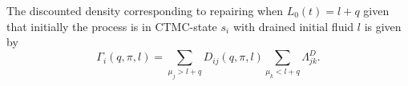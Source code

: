 \begin{theorem}
	The discounted density corresponding to repairing when $L_0(t)=l+q$ given that initially the process is in CTMC-state $s_i$ with drained initial fluid $l$ is given by
	\[
	\Gamma_i(q,\pi,l)=\sum\limits_{\mu_j>l+q}D_{ij}(q,\pi,l)\sum\limits_{\mu_k<l+q}\Lambda_{jk}^D.
	\]
\end{theorem}


